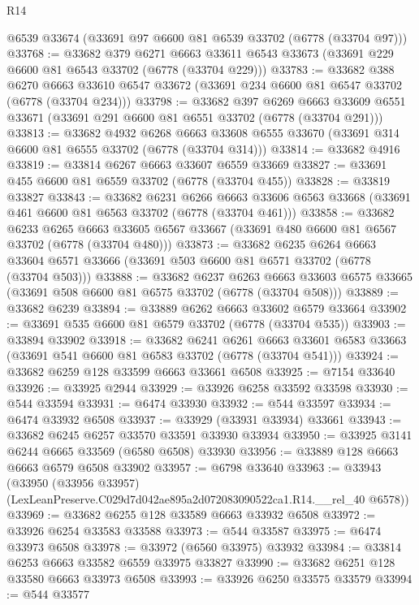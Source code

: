 \begin{lexlean}{R14}
\begin{coremodule}
    @6539
    @33674
    (@33691 @97 @6600 @81 @6539 @33702 (@6778 (@33704 @97)))
@33768 := @33682
    @379
    @6271
    @6663
    @33611
    @6543
    @33673
    (@33691 @229 @6600 @81 @6543 @33702 (@6778 (@33704 @229)))
@33783 := @33682
    @388
    @6270
    @6663
    @33610
    @6547
    @33672
    (@33691 @234 @6600 @81 @6547 @33702 (@6778 (@33704 @234)))
@33798 := @33682
    @397
    @6269
    @6663
    @33609
    @6551
    @33671
    (@33691 @291 @6600 @81 @6551 @33702 (@6778 (@33704 @291)))
@33813 := @33682
    @4932
    @6268
    @6663
    @33608
    @6555
    @33670
    (@33691 @314 @6600 @81 @6555 @33702 (@6778 (@33704 @314)))
@33814 := @33682 @4916
@33819 := @33814 @6267 @6663 @33607 @6559 @33669
@33827 := @33691 @455 @6600 @81 @6559 @33702 (@6778 (@33704 @455))
@33828 := @33819 @33827
@33843 := @33682
    @6231
    @6266
    @6663
    @33606
    @6563
    @33668
    (@33691 @461 @6600 @81 @6563 @33702 (@6778 (@33704 @461)))
@33858 := @33682
    @6233
    @6265
    @6663
    @33605
    @6567
    @33667
    (@33691 @480 @6600 @81 @6567 @33702 (@6778 (@33704 @480)))
@33873 := @33682
    @6235
    @6264
    @6663
    @33604
    @6571
    @33666
    (@33691 @503 @6600 @81 @6571 @33702 (@6778 (@33704 @503)))
@33888 := @33682
    @6237
    @6263
    @6663
    @33603
    @6575
    @33665
    (@33691 @508 @6600 @81 @6575 @33702 (@6778 (@33704 @508)))
@33889 := @33682 @6239
@33894 := @33889 @6262 @6663 @33602 @6579 @33664
@33902 := @33691 @535 @6600 @81 @6579 @33702 (@6778 (@33704 @535))
@33903 := @33894 @33902
@33918 := @33682
    @6241
    @6261
    @6663
    @33601
    @6583
    @33663
    (@33691 @541 @6600 @81 @6583 @33702 (@6778 (@33704 @541)))
@33924 := @33682 @6259 @128 @33599 @6663 @33661 @6508
@33925 := @7154 @33640
@33926 := @33925 @2944
@33929 := @33926 @6258 @33592 @33598
@33930 := @544 @33594
@33931 := @6474 @33930
@33932 := @544 @33597
@33934 := @6474 @33932 @6508
@33937 := @33929 (@33931 @33934) @33661
@33943 := @33682 @6245 @6257 @33570 @33591 @33930 @33934
@33950 := @33925 @3141 @6244 @6665 @33569 (@6580 @6508) @33930
@33956 := @33889 @128 @6663 @6663 @6579 @6508 @33902
@33957 := @6798 @33640
@33963 := @33943
    (@33950 (@33956 @33957) (LexLeanPreserve.C029d7d042ae895a2d072083090522ca1.R14.__rel_40 @6578))
@33969 := @33682 @6255 @128 @33589 @6663 @33932 @6508
@33972 := @33926 @6254 @33583 @33588
@33973 := @544 @33587
@33975 := @6474 @33973 @6508
@33978 := @33972 (@6560 @33975) @33932
@33984 := @33814 @6253 @6663 @33582 @6559 @33975 @33827
@33990 := @33682 @6251 @128 @33580 @6663 @33973 @6508
@33993 := @33926 @6250 @33575 @33579
@33994 := @544 @33577

\end{coremodule}
\end{lexlean}
